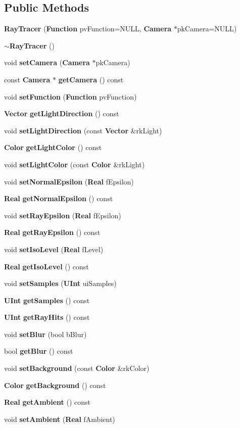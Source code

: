 \subsection*{Public Methods}
\begin{CompactItemize}
\item 
{\bf Ray\-Tracer} ({\bf Function} pv\-Function=NULL, {\bf Camera} $\ast$pk\-Camera=NULL)
\item 
{\bf $\sim$Ray\-Tracer} ()
\item 
void {\bf set\-Camera} ({\bf Camera} $\ast$pk\-Camera)
\item 
const {\bf Camera} $\ast$ {\bf get\-Camera} () const
\item 
void {\bf set\-Function} ({\bf Function} pv\-Function)
\item 
{\bf Vector} {\bf get\-Light\-Direction} () const
\item 
void {\bf set\-Light\-Direction} (const {\bf Vector} \&rk\-Light)
\item 
{\bf Color} {\bf get\-Light\-Color} () const
\item 
void {\bf set\-Light\-Color} (const {\bf Color} \&rk\-Light)
\item 
void {\bf set\-Normal\-Epsilon} ({\bf Real} f\-Epsilon)
\item 
{\bf Real} {\bf get\-Normal\-Epsilon} () const
\item 
void {\bf set\-Ray\-Epsilon} ({\bf Real} f\-Epsilon)
\item 
{\bf Real} {\bf get\-Ray\-Epsilon} () const
\item 
void {\bf set\-Iso\-Level} ({\bf Real} f\-Level)
\item 
{\bf Real} {\bf get\-Iso\-Level} () const
\item 
void {\bf set\-Samples} ({\bf UInt} ui\-Samples)
\item 
{\bf UInt} {\bf get\-Samples} () const
\item 
{\bf UInt} {\bf get\-Ray\-Hits} () const
\item 
void {\bf set\-Blur} (bool b\-Blur)
\item 
bool {\bf get\-Blur} () const
\item 
void {\bf set\-Background} (const {\bf Color} \&rk\-Color)
\item 
{\bf Color} {\bf get\-Background} () const
\item 
{\bf Real} {\bf get\-Ambient} () const
\item 
void {\bf set\-Ambient} ({\bf Real} f\-Ambient)
\item 

\end{CompactItemize}
